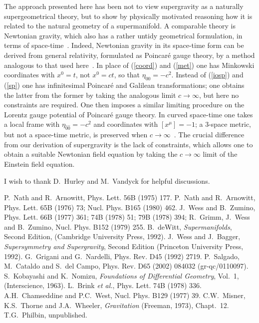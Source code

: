 \documentclass[a4paper,12pt]{article}
\begin{document}
The approach presented here has been not to view supergravity as a naturally supergeometrical theory, but to show by physically motivated reasoning how  it is related to the natural geometry of a supermanifold. A comparable theory is Newtonian gravity, which also has a rather untidy geometrical formulation, in terms of space-time~\cite{mis}. Indeed, Newtonian gravity in its space-time form can be derived from general relativity, formulated as Poincar\'{e} gauge theory, by a method analogous to that used here~\cite{phi}. In place of (\ref{coord}) and (\ref{met}) one has Minkowski coordinates with $x^0=t$, not $x^0=ct$, so that $\eta_{00}=-c^2$. Instead of (\ref{iosp}) and (\ref{sp}) one has infinitesimal Poincar\'{e} and Galilean transformations; one obtains the latter from the former by taking the analogous limit $c\to\infty$, but here no constraints are required. One then imposes a similar limiting procedure on the Lorentz gauge potential of Poincar\'{e} gauge theory. In curved space-time one takes a local frame with $\eta_{\widehat{0}\widehat{0}}=-c^2$ and coordinates with $[x^\mu]=-1$; a 3-space metric, but not a space-time metric, is preserved when $c\to\infty$~\cite{mis}. The crucial difference from our derivation of supergravity is the lack of constraints, which allows one to obtain a suitable Newtonian field equation by taking the $c\to\infty$ limit of the Einstein field equation.
\vspace{5mm}

I wish to thank D.\ Hurley and M.\ Vandyck for helpful discussions.

\begin{thebibliography}{99}
 P.\ Nath and R.\ Arnowitt, Phys. Lett. 56B (1975) 177.
 P.\ Nath and R.\ Arnowitt, Phys. Lett. 65B (1976) 73; Nucl. Phys. B165 (1980) 462.
 J.\ Wess and B.\ Zumino, Phys. Lett. 66B (1977) 361; 74B (1978) 51; 79B (1978) 394; R.\ Grimm, J.\ Wess and B.\ Zumino, Nucl. Phys. B152 (1979) 255.
 B.\ deWitt, {\it Supermanifolds}, Second Edition, (Cambridge University Press, 1992). 
 J.\ Wess and J.\ Bagger, {\it Supersymmetry and Supergravity}, Second Edition (Princeton University Press, 1992).
 G.\ Grigani and G.\ Nardelli, Phys. Rev. D45 (1992) 2719. 
 P.\ Salgado, M.\ Cataldo and S.\ del Campo, Phys. Rev. D65 (2002) 084032 (gr-qc/0110097).
 S.\ Kobayashi and K.\ Nomizu, {\it Foundations of Differential Geometry}, Vol.\ 1, (Interscience, 1963).
 L.\ Brink {\it et al.}, Phys. Lett. 74B (1978) 336.
 A.H.\ Chamseddine and P.C.\ West, Nucl. Phys. B129 (1977) 39.
 C.W.\ Misner, K.S.\ Thorne and J.A.\ Wheeler, {\it Gravitation} (Freeman, 1973), Chapt.~12.
 T.G.\ Philbin, unpublished.
\end{thebibliography}
\end{document}
